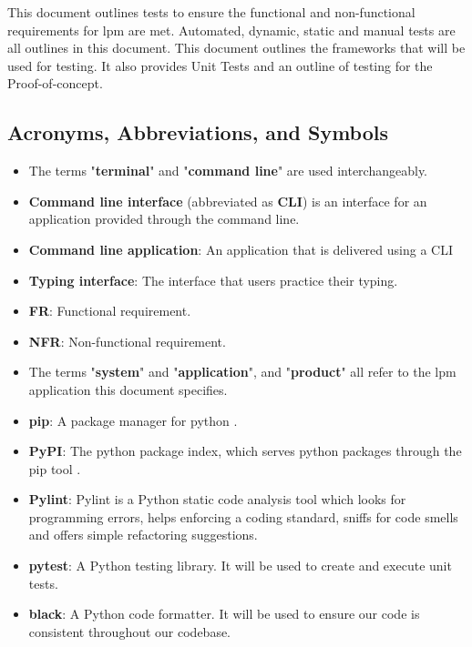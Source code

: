 \documentclass[12pt, titlepage]{article}
\begin{document}
This document outlines tests to ensure the functional and non-functional requirements for lpm are met. Automated, dynamic, static and manual tests are all outlines in this document. This document outlines the frameworks that will be used for testing. It also provides Unit Tests and an outline of testing for the Proof-of-concept.

\subsection{Acronyms, Abbreviations, and Symbols}

\begin{itemize}
    \item The terms "\textbf{terminal}" and "\textbf{command line}" are used interchangeably.
    \item \textbf{Command line interface} (abbreviated as \textbf{CLI}) is an interface for an application provided through the command line.
    \item \textbf{Command line application}: An application that is delivered using a CLI
    \item \textbf{Typing interface}: The interface that users practice their typing.
    \item \textbf{FR}: Functional requirement.
    \item \textbf{NFR}: Non-functional requirement.
    \item The terms "\textbf{system}" and "\textbf{application}", and "\textbf{product}" all refer to the lpm application this document specifies.
    \item \textbf{pip}: A package manager for python \citep{pip}.
    \item \textbf{PyPI}: The python package index, which serves python packages through the pip tool \citep{pypi}.
    \item \textbf{Pylint}: Pylint is a Python static code analysis tool which looks for programming errors, helps enforcing a coding standard, sniffs for code smells and offers simple refactoring suggestions.
    \item \textbf{pytest}: A Python testing library. It will be used to create and execute unit tests.
    \item \textbf{black}: A Python code formatter. It will be used to ensure our code is consistent throughout our codebase.
\end{itemize}

\end{document}
